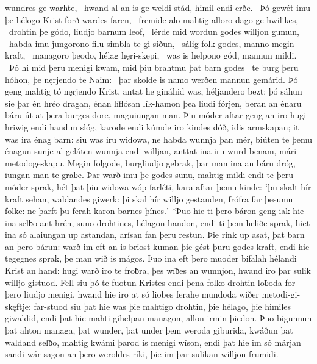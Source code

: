wundres ge-warhte, \hld\ hwand al an is ge-weldi stád,
himil endi erðe. \hld\ Þó gewét imu þe hélogo Krist
forð-wardes faren, \hld\ fremide alo-mahtig
alloro dago ge-hwilikes, \hld\ drohtin þe gódo,
liudjo barnum leof, \hld\ lérde mid wordun
godes willjon gumun, \hld\ habda imu jungorono filu
simbla te gi-síðun, \hld\ sálig folk godes,
manno megin-kraft, \hld\ managoro þeodo,
hélag hęri-skępi, \hld\ was is helpono gód,
mannun mildi. \hld\ Þó hi mid þeru menigi kwam,
mid þiu brahtmu þat barn godes \hld\ te burg þeru hóhon,
þe nęrjendo te Naim: \hld\ þar skolde is namo werðen
mannun gemárid. \hld\ Þó geng mahtig tó
nęrjendo Krist, \hld\ antat he gináhid was,
héljandero bezt: \hld\ þó sáhun sie þar én hréo dragan,
énan líflósan lík-hamon \hld\ þea liudi fórjen,
beran an énaru báru \hld\ út at þera burges dore,
maguiungan man. \hld\ Þiu móder aftar geng
an iro hugi hriwig \hld\ endi handun slóg,
karode endi kúmde \hld\ iro kindes dóð,
idis armskapan; \hld\ it was ira énag barn:
siu was iru widowa, \hld\ ne habda wunnja þan mér,
biúten te þemu énagun \hld\ sunje al geláten
wunnja endi willjan, \hld\ anttat ina iru wurd benam,
mári metodogeskapu. \hld\ Megin folgode,
burgliudjo gebrak, \hld\ þar man ina an báru dróg,
iungan man te graƀe. \hld\ Þar warð imu þe godes sunu,
mahtig mildi \hld\ endi te þeru móder sprak,
hét þat þiu widowa \hld\ wóp farléti,
kara aftar þemu kinde: \hld\ ʽþu skalt hír kraft sehan,
waldandes giwerk: \hld\ þi skal hír willjo gestanden,
frófra far þesumu folke: \hld\ ne þarft þu ferah karon
barnes þínes.ʼ \hld\ *Þuo hie ti þero báron geng
iak hie ina selƀo ant-hrén, \hld\ suno drohtines,
hélagon handon, \hld\ endi ti þem heliðe sprak,
hiet ina só alaiungan \hld\ up astandan,
arísan fan þeru restun. \hld\ Þie rink up asat,
þat barn an þero bárun: \hld\ warð im eft an is briost kuman
þie gést þuru godes kraft, \hld\ endi hie tegegnes sprak,
þe man wið is mágos. \hld\ Þuo ina eft þero muoder bifalah
hélandi Krist an hand: \hld\ hugi warð iro te froƀra,
þes wíƀes an wunnjon, \hld\ hwand iro þar sulik willjo gistuod.
Fell siu þó te fuotun Kristes \hld\ endi þena folko drohtin
loƀoda for þero liudjo menigi, \hld\ hwand hie iro at só liobes ferahe
mundoda wiðer metodi-gi-skęftje: \hld\ far-stuod siu þat hie was þie mahtigo drohtin,
þie hélago, þie himiles giwaldid, \hld\ endi þat hie mahti gihelpan managon,
allon irmin-þiedon. \hld\ Þuo bigunnun þat ahton managa,
þat wunder, þat under þem weroda giburida, \hld\ kwáðun þat waldand selƀo,
mahtig kwámi þarod is menigi wíson, \hld\ endi þat hie im só márjan sandi
wár-sagon an þero weroldes ríki, \hld\ þie im þar sulikan willjon frumidi.
